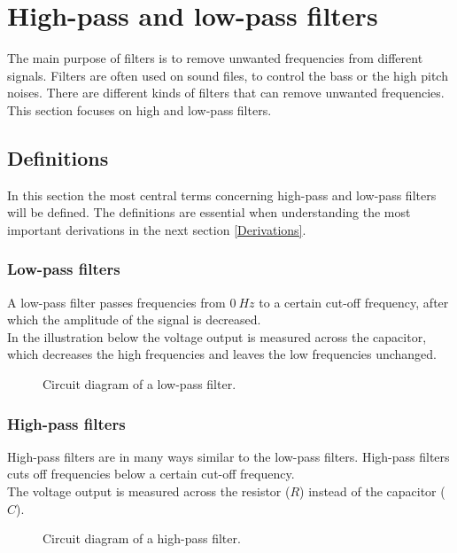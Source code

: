 \chapter{High-pass and low-pass filters} \label{chap:high_low}
The main purpose of filters is to remove unwanted frequencies from different signals. Filters are often used on sound files, to control the bass or the high pitch noises. There are different kinds of filters that can remove unwanted frequencies. This section focuses on high and low-pass filters.

\section{Definitions}
In this section the most central terms concerning high-pass and low-pass filters will be defined. The definitions are essential when understanding the most important derivations in the next section \ref{Derivations}.

\subsection{Low-pass filters}
A low-pass filter passes frequencies from  $0~Hz$ to a certain cut-off frequency, after which the amplitude of the signal is decreased.  
\\
In the illustration below the voltage output is measured across the capacitor, which decreases the high frequencies and leaves the low frequencies unchanged.
\\
\begin{figure}[H]
	
	\caption{Circuit diagram of a low-pass filter.} \label{lp:diagram}
\end{figure} 
\subsection{High-pass filters}
High-pass filters are in many ways similar to the low-pass filters. High-pass filters cuts off frequencies below a certain cut-off frequency. \\
The voltage output is measured across the resistor ($R$) instead of the capacitor ($C$). 
\begin{figure}[H]
	
	\caption{Circuit diagram of a high-pass filter.}
	\label{hp:diagram}
\end{figure} 

